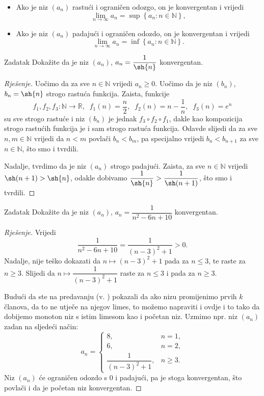 \begin{remark} \textbf{}
\label{suffcond}
\begin{itemize}
\item Ako je niz \((a_n)\) rastući i ograničen odozgo, on je konvergentan i vrijedi \[\lim\limits_{n\to\infty}{a_n}=\sup{\left\{a_n : n\in \mathbb{N}\right\}},\]
\item Ako je niz \((a_n)\) padajući i ograničen odozdo, on je konvergentan i vrijedi \[\lim\limits_{n\to\infty}{a_n}=\inf{\left\{a_n : n\in \mathbb{N}\right\}}.\]
\end{itemize}
\end{remark}
\begin{exercise}{Zadatak}
Dokažite da je niz \((a_n)\), \(a_n=\dfrac{1}{\sh{n}}\) konvergentan.
\end{exercise}
\begin{proof}[Rješenje]
Uočimo da za sve \(n\in \mathbb{N}\) vrijedi \(a_n\geq 0\). Uočimo da je niz \((b_n)\), \(b_n=\sh{n}\) strogo rastuća funkcija. Zaista, funkcije \[f_1, f_2, f_3 : \mathbb{N}\to \mathbb{R},\;\;f_1(n)=\dfrac{n}{2},\;\;f_2(n)=n-\dfrac{1}{n},\;\;f_3(n)=e^n\] su sve strogo rastuće i niz \((b_n)\) je jednak \(f_3\circ f_2\circ f_1\), dakle kao kompozicija strogo rastućih funkcija je i sam strogo rastuća funkcija. Odavde slijedi da za sve \(n, m\in \mathbb{N}\) vrijedi da \(n<m\) povlači \(b_n<b_m\), pa specijalno vrijedi \(b_n<b_{n+1}\) za sve \(n\in \mathbb{N}\), što smo i tvrdili.

Nadalje, tvrdimo da je niz \((a_n)\) strogo padajući. Zaista, za sve \(n\in \mathbb{N}\) vrijedi \(\sh(n+1)>\sh{n}\), odakle dobivamo \(\dfrac{1}{\sh{n}}>\dfrac{1}{\sh(n+1)}\), što smo i tvrdili.
\end{proof}
\begin{exercise}{Zadatak}
\label{8}
Dokažite da je niz \((a_n)\), \(a_n=\dfrac{1}{n^2-6n+10}\) konvergentan.
\end{exercise}
\begin{proof}[Rješenje]
Vrijedi
\[\dfrac{1}{n^2-6n+10}=\dfrac{1}{(n-3)^2+1}>0.\] Nadalje, nije teško dokazati da \(n\mapsto (n-3)^2+1\) pada za \(n\leq 3\), te raste za \(n\geq 3\). Slijedi da \(n\mapsto \dfrac{1}{(n-3)^2+1}\) raste za \(n\leq 3\) i pada za \(n\geq 3\). 

Budući da ste na predavanju (v. \cite{3}) pokazali da ako nizu promijenimo prvih \(k\) članova, da to ne utječe na njegov limes, to možemo napraviti i ovdje i to tako da dobijemo monoton niz s istim limesom kao i početan niz. Uzmimo npr. niz \((a_n)\) zadan na sljedeći način: 
\[a_n=\begin{cases}
8, & n=1,\\
6, & n=2,\\
\dfrac{1}{(n-3)^2+1}, & n\geq 3.
\end{cases}\] 
Niz \((a_n)\) će ograničen odozdo s \(0\) i padajući, pa je stoga konvergentan, što povlači i da je početan niz konvergentan.
\end{proof}
